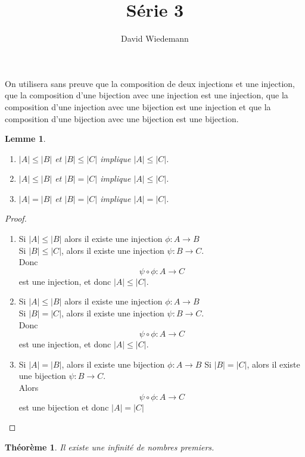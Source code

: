 \documentclass[11pt, a4paper, twoside]{article}
\newtheorem{theorem}{Théorème}
\newtheorem{lemma}{Lemme}
\begin{document}
\title{Série 3}
\author{David Wiedemann}
\maketitle
On utilisera sans preuve que la composition de deux injections et une injection, que la composition d'une bijection avec une injection est une injection, que la composition d'une injection avec une bijection est une injection et que la composition d'une bijection avec une bijection est une bijection.\\
\begin{lemma}
	$ $\\
	\begin{enumerate}
		\item $|A| \leq |B|$ et $|B| \leq |C|$ implique $|A| \leq |C|$.
		\item $|A| \leq |B|$ et $|B| = |C|$ implique $|A| \leq |C|$.
		\item $|A| = |B|$ et $|B| = |C|$ implique $|A| = |C|$.
	\end{enumerate}
\end{lemma}
\begin{proof}
	\begin{enumerate}
		\item Si $|A| \leq |B|$ alors il existe une injection  $\phi: A \to B$\\
		Si $|B| \leq |C|$, alors il existe une injection $\psi:B \to C$.\\
		Donc 
		\[ 
			\psi \circ \phi : A \to C
		\]
		est une injection, et donc
		$|A| \leq |C|$.
	\item Si $|A| \leq |B|$ alors il existe une injection  $\phi: A \to B$\\
	Si $|B| = |C|$, alors il existe une injection $\psi:B \to C$.\\
	Donc
		\[ 
			\psi \circ \phi : A \to C
		\]
		est une injection, et donc $|A| \leq |C|$.
	\item Si $|A| = |B|$, alors il existe une bijection  $\phi: A \to B$
	 Si $|B| = |C|$, alors il existe une bijection  $\psi: B \to C$.\\
	 Alors
	 \[ 
	 \psi \circ \phi : A \to C
	 \]
	 est une bijection et donc $|A| = |C|$
	 
	 
		
	\end{enumerate}
\end{proof}


\begin{theorem}
	Il existe une infinité de nombres premiers.
\end{theorem}
\end{document}
